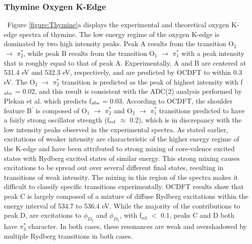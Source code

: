 \documentclass[12pt]{article}
\begin{document}
\subsubsection{Thymine Oxygen K-Edge}
\ Figure \ref{figure:Thymine}a displays the experimental and theoretical oxygen K-edge  spectra of thymine. The low energy regime of the oxygen K-edge is dominated by two high intensity peaks. Peak A results from the transition O$_2$ $\rightarrow$ $\pi^*_2$, while peak B results from the transition O$_1$ $\rightarrow$ $\pi^*_1$ with a peak intensity that is roughly equal to that of peak A. Experimentally, A and B are centered at 531.4 eV and 532.3 eV, respectively, and are predicted by OCDFT to within 0.3 eV. The  O$_2$ $\rightarrow$ $\pi_2^*$ transition is predicted as the peak of highest intensity with f$_{\rm abs}$ = 0.02, and this result is consistent with the ADC(2) analysis performed by Plekan et al. \cite{plekan_theoretical_2008} which predicts f$_{\rm abs}$ = 0.03. According to OCDFT, the shoulder feature B$^{\prime}$ is composed of O$_1$ $\rightarrow$ $\pi^*_2$ and O$_2$ $\rightarrow$ $\pi^*_1$ transitions predicted to have a fairly strong oscillator strength (f$_{\rm rel}$ $\approx$ 0.2), which is in discrepancy with the low intensity peaks observed in the experimental spectra.  As stated earlier, excitations of weaker intensity are characteristic of the higher energy regime of the K-edge and have been attributed to strong mixing of core-valence excited states with Rydberg excited states of similar energy.\cite{robin_rydberg_1975} This strong mixing causes excitations to be spread out over several different final states, resulting in transitions of weak intensity. The mixing in this region of the spectra makes it difficult to classify specific transitions experimentally. OCDFT results show that peak C is largely composed of a mixture of diffuse Rydberg excitations within the energy interval of 534.7 to 536.4 eV. While the majority of the contributions to peak D, are excitations to $\phi_{D_2}$ and $\phi_{D_5}$, with f$_{\text{rel}}$ $<$ 0.1, peaks C and D both have $\pi^*_3$ character. In both cases, these resonances are weak and overshadowed by multiple Rydberg transitions in both cases. 
\end{document}
